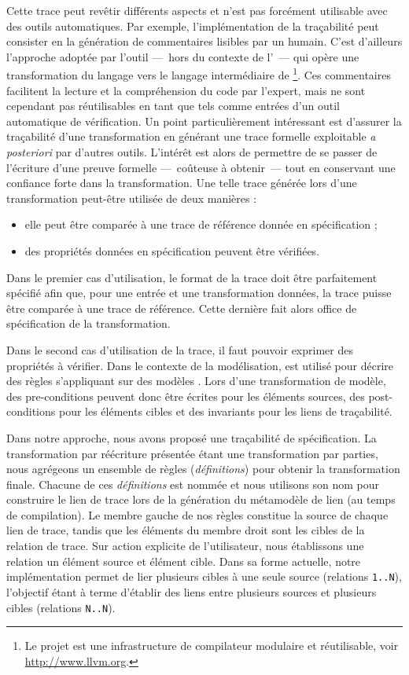 Cette trace peut revêtir différents aspects et n'est pas forcément utilisable
avec des outils automatiques. Par exemple, l'implémentation de la traçabilité
peut consister en la génération de commentaires lisibles par un humain.  C'est
d'ailleurs l'approche adoptée par l'outil {\btollvm} ---~hors du contexte de
l'{\idm}~--- qui opère une transformation du langage {\B} vers le langage
intermédiaire de {\llvm}\footnote{Le projet {\llvm} est une infrastructure de
compilateur modulaire et réutilisable, voir \url{http://www.llvm.org}.}. Ces
commentaires facilitent la lecture et la compréhension du code par l'expert,
mais ne sont cependant pas réutilisables en tant que tels comme entrées d'un
outil automatique de vérification. Un point particulièrement intéressant est
d'assurer la traçabilité d'une transformation en générant une trace formelle
exploitable \emph{a posteriori} par d'autres outils. L'intérêt est alors de
permettre de se passer de l'écriture d'une preuve formelle ---~coûteuse à
obtenir~--- tout en conservant une confiance forte dans la transformation. Une
telle trace générée lors d'une transformation peut-être utilisée de deux
manières :
\begin{itemize}
  \item elle peut être comparée à une trace de référence donnée en spécification ;
  \item des propriétés données en spécification peuvent être vérifiées.
\end{itemize}

Dans le premier cas d'utilisation, le format de la trace doit être parfaitement
spécifié afin que, pour une entrée et une transformation données, la trace
puisse être comparée à une trace de référence. Cette dernière fait alors office
de spécification de la transformation. 

Dans le second cas d'utilisation de la trace, il faut pouvoir exprimer des
propriétés à vérifier. Dans le contexte de la modélisation, {\ocl} est utilisé
pour décrire des règles s'appliquant sur des modèles {\uml}. Lors d'une
transformation de modèle, des pre-conditions peuvent donc être écrites pour les
éléments sources, des post-conditions pour les éléments cibles et des
invariants pour les liens de traçabilité.

Dans notre approche, nous avons proposé une traçabilité de spécification. La
transformation par réécriture présentée étant une transformation par parties,
nous agrégeons un ensemble de règles (\emph{définitions}) pour obtenir la
transformation finale. Chacune de ces \emph{définitions} est nommée et nous
utilisons son nom pour construire le lien de trace lors de la génération du
métamodèle de lien (au temps de compilation). Le membre gauche de nos règles
constitue la source de chaque lien de trace, tandis que les éléments du membre
droit sont les cibles de la relation de trace. Sur action explicite de
l'utilisateur, nous établissons une relation un élément source et élément
cible. Dans sa forme actuelle, notre implémentation permet de lier plusieurs
cibles à une seule source (relations \texttt{1..N}), l'objectif étant à terme
d'établir des liens entre plusieurs sources et plusieurs cibles (relations
\texttt{N..N}).

